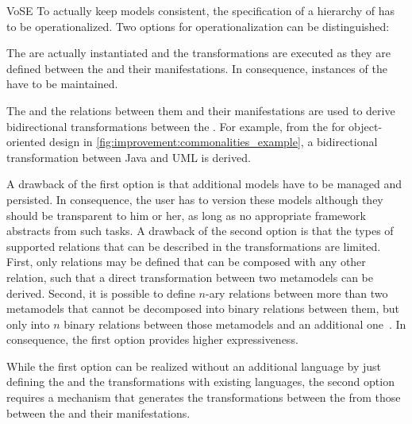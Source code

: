 \begin{copiedFrom}{VoSE}
To actually keep models consistent, the specification of a hierarchy of \conceptmetamodels has to be operationalized.
Two options for operationalization can be distinguished:

\begin{description}[leftmargin=\parindent]
    \item[\Conceptmetamodels as additional metamodels:] The \conceptmetamodels are actually instantiated and the transformations are executed as they are defined between the \conceptmetamodels and their manifestations. In consequence, instances of the \conceptmetamodels have to be maintained.
    \item[Transformations between \concretemetamodels:] The \conceptmetamodels and the relations between them and their manifestations are used to derive bidirectional transformations between the \concretemetamodels. For example, from the \conceptmetamodel for object-oriented design in \autoref{fig:improvement:commonalities_example}, a bidirectional transformation between Java and UML is derived.
\end{description}

A drawback of the first option is that additional models have to be managed and persisted. 
In consequence, the user has to version these models although they should be transparent to him or her, as long as no appropriate framework abstracts from such tasks.
A drawback of the second option is that the types of supported relations that can be described in the transformations are limited.
First, only relations may be defined that can be composed with any other relation, such that a direct transformation between two metamodels can be derived.
Second, it is possible to define $n$-ary relations between more than two metamodels that cannot be decomposed into binary relations between them, but only into $n$ binary relations between those metamodels and an additional one~\cite{stevens2020BidirectionalTransformationLarge-SoSym}.
In consequence, the first option provides higher expressiveness.

While the first option can be realized without an additional language by just defining the \conceptmetamodels and the transformations with existing languages, the second option requires a mechanism that generates the transformations between the \concretemetamodels from those between the \conceptmetamodels and their manifestations.

\end{copiedFrom} %